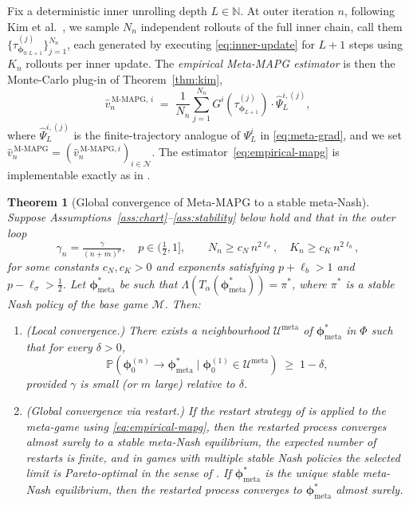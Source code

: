 \documentclass[11pt]{article}
\newtheorem{theorem}{Theorem}
\theoremstyle{definition}
\newcommand{\Prob}{\mathbb{P}}
\newcommand{\N}{\mathbb{N}}
\newcommand{\calN}{\mathcal{N}}
\newcommand{\calM}{\mathcal{M}}
\newcommand{\calU}{\mathcal{U}}
\newcommand{\meta}{\mathrm{meta}}
\newcommand{\MAPG}{\mathrm{M\text{-}MAPG}}
\begin{document}
Fix a deterministic inner unrolling depth $L\in\N$. At outer iteration $n$, following Kim et al.~\cite{Kim2021}, we sample $N_n$ independent rollouts of the full inner chain, call them $\{\tau^{(j)}_{\bm\phi_{0:L+1}}\}_{j=1}^{N_n}$, each generated by executing \eqref{eq:inner-update} for $L+1$ steps using $K_n$ rollouts per inner update. The \emph{empirical Meta-MAPG estimator} is then the Monte-Carlo plug-in of Theorem~\ref{thm:kim},
\begin{equation}\label{eq:empirical-mapg}
\hat v_n^{\,\MAPG,\,i}
\;=\;
\frac{1}{N_n}\sum_{j=1}^{N_n} G^i(\tau^{(j)}_{\bm\phi_{L+1}})\cdot \hat\Psi^{i,(j)}_{L},
\end{equation}
where $\hat\Psi^{i,(j)}_{L}$ is the finite-trajectory analogue of $\Psi^i_L$ in \eqref{eq:meta-grad}, and we set $\hat v_n^{\,\MAPG}=(\hat v_n^{\,\MAPG,i})_{i\in\calN}$. The estimator~\eqref{eq:empirical-mapg} is implementable exactly as in \cite[Alg.~1]{Kim2021}.

\begin{theorem}[Global convergence of Meta-MAPG to a stable meta-Nash]\label{thm:main}
Suppose Assumptions~\ref{ass:chart}--\ref{ass:stability} below hold and that in the outer loop
\begin{equation}\label{eq:rate-choices}
\gamma_n = \tfrac{\gamma}{(n+m)^p},\quad p\in(\tfrac12,1],\qquad
N_n\ge c_N\,n^{2\ell_\sigma},\quad
K_n\ge c_K\,n^{2\ell_b},
\end{equation}
for some constants $c_N,c_K>0$ and exponents satisfying $p+\ell_b>1$ and $p-\ell_\sigma>\tfrac12$. Let $\bm\phi^*_{\meta}$ be such that $\Lambda(T_\alpha(\bm\phi^*_\meta))=\pi^*$, where $\pi^*$ is a stable Nash policy of the base game $\calM$. Then:
\begin{enumerate}[label=(\roman*), leftmargin=2em]
\item (Local convergence.) There exists a neighbourhood $\calU^\meta$ of $\bm\phi^*_{\meta}$ in $\Phi$ such that for every $\delta>0$,
\begin{equation}
\Prob\!\left(\bm\phi_0^{(n)}\to\bm\phi^*_{\meta}\;\big|\;\bm\phi_0^{(1)}\in\calU^\meta\right)\;\ge\;1-\delta,
\end{equation}
provided $\gamma$ is small (or $m$ large) relative to $\delta$.
\item (Global convergence via restart.) If the restart strategy of \cite[§4]{Giannou2022} is applied to the meta-game using \eqref{eq:empirical-mapg}, then the restarted process converges almost surely to a stable meta-Nash equilibrium, the expected number of restarts is finite, and in games with multiple stable Nash policies the selected limit is Pareto-optimal in the sense of \cite[Prop.~4.3]{Giannou2022}. If $\bm\phi^*_{\meta}$ is the unique stable meta-Nash equilibrium, then the restarted process converges to $\bm\phi^*_{\meta}$ almost surely.
\end{enumerate}
\end{theorem}
\end{document}
